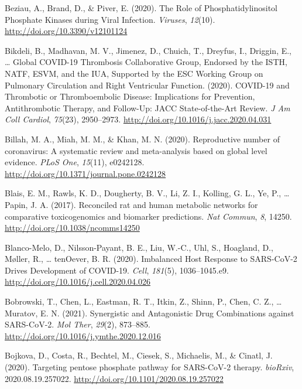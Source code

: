 \documentclass[12pt,twoside,openany,\mydriver]{thesis}  %
\begin{document}
\leavevmode\hypertarget{ref-beziau_role_2020}{}%
Beziau, A., Brand, D., \& Piver, E. (2020). The Role of Phosphatidylinositol Phosphate Kinases during Viral Infection. \emph{Viruses}, \emph{12}(10). \url{http://doi.org/10.3390/v12101124}

\leavevmode\hypertarget{ref-bikdeli_covid-19_2020}{}%
Bikdeli, B., Madhavan, M. V., Jimenez, D., Chuich, T., Dreyfus, I., Driggin, E., \ldots{} Global COVID-19 Thrombosis Collaborative Group, Endorsed by the ISTH, NATF, ESVM, and the IUA, Supported by the ESC Working Group on Pulmonary Circulation and Right Ventricular Function. (2020). COVID-19 and Thrombotic or Thromboembolic Disease: Implications for Prevention, Antithrombotic Therapy, and Follow-Up: JACC State-of-the-Art Review. \emph{J Am Coll Cardiol}, \emph{75}(23), 2950--2973. \url{http://doi.org/10.1016/j.jacc.2020.04.031}

\leavevmode\hypertarget{ref-billah_reproductive_2020}{}%
Billah, M. A., Miah, M. M., \& Khan, M. N. (2020). Reproductive number of coronavirus: A systematic review and meta-analysis based on global level evidence. \emph{PLoS One}, \emph{15}(11), e0242128. \url{http://doi.org/10.1371/journal.pone.0242128}

\leavevmode\hypertarget{ref-blais_reconciled_2017}{}%
Blais, E. M., Rawls, K. D., Dougherty, B. V., Li, Z. I., Kolling, G. L., Ye, P., \ldots{} Papin, J. A. (2017). Reconciled rat and human metabolic networks for comparative toxicogenomics and biomarker predictions. \emph{Nat Commun}, \emph{8}, 14250. \url{http://doi.org/10.1038/ncomms14250}

\leavevmode\hypertarget{ref-blanco-melo_imbalanced_2020}{}%
Blanco-Melo, D., Nilsson-Payant, B. E., Liu, W.-C., Uhl, S., Hoagland, D., Møller, R., \ldots{} tenOever, B. R. (2020). Imbalanced Host Response to SARS-CoV-2 Drives Development of COVID-19. \emph{Cell}, \emph{181}(5), 1036--1045.e9. \url{http://doi.org/10.1016/j.cell.2020.04.026}

\leavevmode\hypertarget{ref-bobrowski_synergistic_2021}{}%
Bobrowski, T., Chen, L., Eastman, R. T., Itkin, Z., Shinn, P., Chen, C. Z., \ldots{} Muratov, E. N. (2021). Synergistic and Antagonistic Drug Combinations against SARS-CoV-2. \emph{Mol Ther}, \emph{29}(2), 873--885. \url{http://doi.org/10.1016/j.ymthe.2020.12.016}

\leavevmode\hypertarget{ref-bojkova_targeting_2020}{}%
Bojkova, D., Costa, R., Bechtel, M., Ciesek, S., Michaelis, M., \& Cinatl, J. (2020). Targeting pentose phosphate pathway for SARS-CoV-2 therapy. \emph{bioRxiv}, 2020.08.19.257022. \url{http://doi.org/10.1101/2020.08.19.257022}
\end{document}
